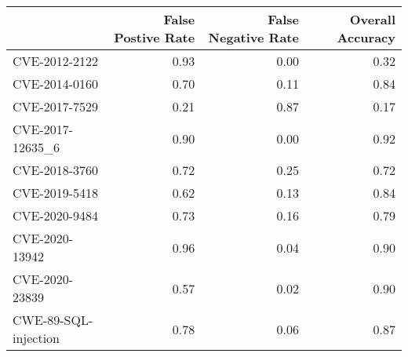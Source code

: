 \begin{tabular}{lrrr}
\toprule
{} &  False Postive Rate &  False Negative Rate &  Overall Accuracy \\
\midrule
CVE-2012-2122        &                0.93 &                 0.00 &              0.32 \\
CVE-2014-0160        &                0.70 &                 0.11 &              0.84 \\
CVE-2017-7529        &                0.21 &                 0.87 &              0.17 \\
CVE-2017-12635\_6     &                0.90 &                 0.00 &              0.92 \\
CVE-2018-3760        &                0.72 &                 0.25 &              0.72 \\
CVE-2019-5418        &                0.62 &                 0.13 &              0.84 \\
CVE-2020-9484        &                0.73 &                 0.16 &              0.79 \\
CVE-2020-13942       &                0.96 &                 0.04 &              0.90 \\
CVE-2020-23839       &                0.57 &                 0.02 &              0.90 \\
CWE-89-SQL-injection &                0.78 &                 0.06 &              0.87 \\
\bottomrule
\end{tabular}
